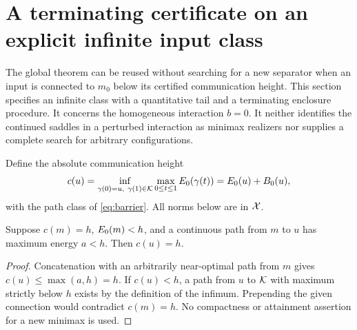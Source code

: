 \section{A terminating certificate on an explicit infinite input class}
\label{sec:local-class}

The global theorem can be reused without searching for a new separator
when an input is connected to $m_0$ below its certified communication
height. This section specifies an infinite class with a quantitative
tail and a terminating enclosure procedure. It concerns the homogeneous
interaction $b=0$. It neither identifies the continued saddles in a
perturbed interaction as minimax realizers nor supplies a complete search
for arbitrary configurations.

Define the absolute communication height
\[
 c(u)=\inf_{\gamma(0)=u,\ \gamma(1)\in\mathcal K}
                  \max_{0\le t\le1}E_0(\gamma(t))
      =E_0(u)+B_0(u),
\]
with the path class of \cref{eq:barrier}. All norms below are in $\mathcal X$.

\begin{lemma}\label{lem:subcritical}
Suppose $c(m)=h$, $E_0(m)<h$, and a continuous path from $m$ to $u$
has maximum energy $a<h$. Then $c(u)=h$.
\end{lemma}
\begin{proof}
Concatenation with an arbitrarily near-optimal path from $m$ gives
$c(u)\le\max(a,h)=h$. If $c(u)<h$, a path from $u$ to $\mathcal K$ with
maximum strictly below $h$ exists by the definition of the infimum.
Prepending the given connection would contradict $c(m)=h$.
No compactness or attainment assertion for a new minimax is used.
\end{proof}


